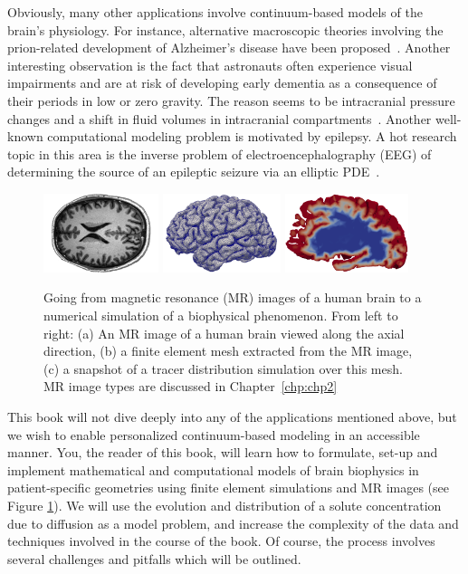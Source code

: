 Obviously, many other applications involve continuum-based models of
the brain's physiology.  For instance, alternative macroscopic
theories involving the prion-related development of Alzheimer's
disease have been proposed~\cite{fornari2019prion,
  kevrekidis2020anisotropic}. Another interesting observation is the
fact that astronauts often experience visual impairments and are at
risk of developing early dementia as a consequence of their periods in
low or zero gravity. The reason seems to be intracranial pressure
changes and a shift in fluid volumes in intracranial
compartments~\cite{alperin2018spaceflight}.  Another well-known
computational modeling problem is motivated by epilepsy. A hot
research topic in this area is the inverse problem of
electroencephalography (EEG) of determining the source of an epileptic
seizure via an elliptic PDE~\cite{grech2008review}.

\begin{figure}
  \begin{center}
  \includegraphics[height=2.3cm]{./graphics/chp1/T1-image-rot-white}
  \includegraphics[height=2.3cm]{./graphics/chp1/ernie-volume-64}
  \includegraphics[height=2.3cm]{./graphics/chp1/soltn-t30-crop}
  \hfill
  \end{center}
  \caption{Going from magnetic resonance (MR) images of a human brain
    to a numerical simulation of a biophysical phenomenon. From left
    to right: (a) An MR image of a human brain viewed along the axial
    direction, (b) a finite element mesh extracted from the MR image,
    (c) a snapshot of a tracer distribution simulation over this
    mesh. MR image types are discussed in Chapter~\ref{chp:chp2}}
  \label{fig:chp1:pipeline}
\end{figure}
This book will not dive deeply into any of the applications mentioned
above, but we wish to enable personalized continuum-based modeling in
an accessible manner. You, the reader of this book, will learn how to
formulate, set-up and implement mathematical and computational models
of brain biophysics in patient-specific geometries using finite
element simulations and MR images (see Figure
\ref{fig:chp1:pipeline}). We will use the evolution and distribution
of a solute concentration due to diffusion as a model problem, and
increase the complexity of the data and techniques involved in the
course of the book. Of course, the process involves several challenges
and pitfalls which will be outlined.

